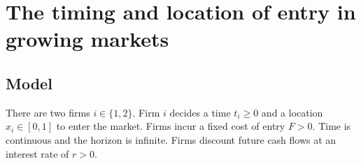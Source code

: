 \chapter{The timing and location of entry in growing markets}

\section{Model}

There are two firms $i \in \{1, 2\}$. Firm $i$ decides a time $t_i \geq 0$ and a location $x_i \in [0, 1]$ to enter the market. Firms incur a fixed cost of entry $F > 0$. Time is continuous and the horizon is infinite. Firms discount future cash flows at an interest rate of $r > 0$.